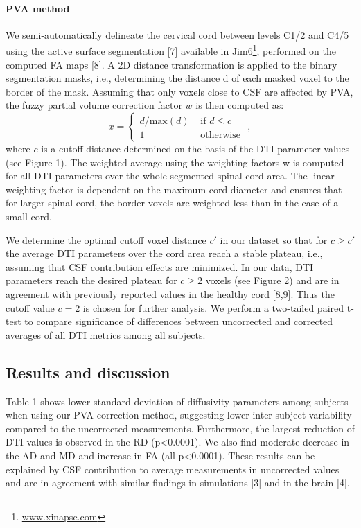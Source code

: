 \paragraph{PVA method} We semi-automatically delineate the cervical cord between levels C1/2 and C4/5 using the active surface segmentation [7] available in Jim6\footnote{\url{www.xinapse.com}}, performed on the computed FA maps [8]. A 2D distance transformation is applied to the binary segmentation masks, i.e., determining the distance d of each masked voxel to the border of the mask. Assuming that only voxels close to CSF are affected by PVA, the fuzzy partial volume correction factor $w$ is then computed as: 
\begin{equation}
	x =\left\{
	\begin{array}{lll}
		d/\mbox{max}(d)&\mbox{ if } d\leq c\\
		1&\mbox{ otherwise } 
	\end{array}
	\right.,	
\end{equation}
where $c$ is a cutoff distance determined on the basis of the DTI parameter values (see Figure 1). The weighted average using the weighting factors w is computed for all DTI parameters over the whole segmented spinal cord area. The linear weighting factor is dependent on the maximum cord diameter and ensures that for larger spinal cord, the border voxels are weighted less than in the case of a small cord. 


We determine the optimal cutoff voxel distance $c'$ in our dataset so that for $c\geq c'$ the average DTI parameters over the cord area reach a stable plateau, i.e., assuming that CSF contribution effects are minimized. In our data, DTI parameters reach the desired plateau for $c\geq 2$ voxels (see Figure 2) and are in agreement with previously reported values in the healthy cord [8,9]. Thus the cutoff value $c=2$ is chosen for further analysis. We perform a two-tailed paired t-test to compare significance of differences between uncorrected and corrected averages of all DTI metrics among all subjects. 
\subsection*{Results and discussion} Table 1 shows lower standard deviation of diffusivity parameters among subjects when using our PVA correction method, suggesting lower inter-subject variability compared to the uncorrected measurements. Furthermore, the largest reduction of DTI values is observed in the RD (p<0.0001). We also find moderate decrease in the AD and MD and increase in FA (all p<0.0001). These results can be explained by CSF contribution to average measurements in uncorrected values and are in agreement with similar findings in simulations [3] and in the brain [4]. 
